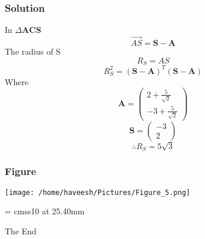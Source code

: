 \documentclass{beamer}
\begin{document}
\begin{comment}
	\begin{frame}
	\frametitle{Solution}
	The distance \textbf{SC} is 
	$$ d^2 = \left( \mathbf{S}-\mathbf{C} \right)^T\left( \mathbf{S}-\mathbf{C} \right) $$
	
	Where \textbf{S} and \textbf{C} are 
	
	$$ \mathbf{S}= \left(\begin{matrix}
	-3 \\
	2
	\end{matrix} \right) $$
	
	$$ \mathbf{C} = \left(\begin{matrix}
	2 \\
	-3
	\end{matrix}\right)
	$$
	From this 
	$$ d = 5\sqrt{2} $$
	\end{frame}
	
	\begin{frame}
	\frametitle{Solution}
	$$ \mathbf{BC} = \mathbf{CA} = R = 5 $$
	$$ \mathbf{SB} = \mathbf{SA} = R_S $$
	
	In $\Delta\mathbf{SCA}$, using pythagoras theorem 
	$$ (SA)^2 = (AC)^2 + (CS)^2 $$
	$$ R_S^2 = d^2 + R^2 $$
	$$ \therefore R_S = 5\sqrt{3} $$
	\end{frame}
\end{comment}

\begin{frame}
\frametitle{Solution}
In $\Delta\mathbf{ACS}$
$$ \vec{AS}=\mathbf{S}-\mathbf{A} $$
The radius of S 
$$ R_S = AS $$ 
$$ R_S^2 = (\mathbf{S}-\mathbf{A})^T(\mathbf{S}-\mathbf{A}) $$ 
Where
$$ \mathbf{A} = \left(\begin{matrix}
2+\frac{5}{\sqrt{2}} \\
-3+\frac{5}{\sqrt{2}}
\end{matrix} \right) $$
$$ \mathbf{S}= \left(\begin{matrix}
-3 \\
2
\end{matrix} \right) $$
$$ \therefore R_S = 5\sqrt{3} $$ 

\end{frame}

\begin{frame}
\frametitle{Figure}
\texttt{[image: /home/haveesh/Pictures/Figure\_5.png]}
\end{frame}

\begin{frame}

  
    
    
      \begin{center}

        \font\endfont = cmss10 at 25.40mm
        \color{black}
        \endfont 
        \baselineskip 20.0mm

        The End

      \end{center}    

    
  

\end{frame}
\end{document}

